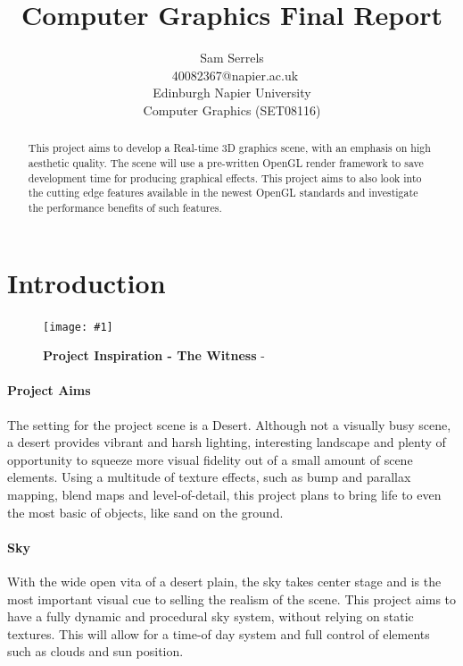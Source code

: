 \documentclass[conference]{acmsiggraph}
\title{Computer Graphics Final Report}
\author{Sam Serrels\\\ 40082367@napier.ac.uk \\
Edinburgh Napier University\\
Computer Graphics (SET08116)}
\newcommand{\figuremacroW}[4]{
	\begin{figure}[h] %
		\centering
		\texttt{[image: \#1]}
		\caption[#2]{\textbf{#2} - #3}
		\label{fig:#1}
	\end{figure}
}
\begin{document}

\maketitle

\begin{abstract}
This project aims to develop a Real-time 3D graphics scene, with an emphasis on high aesthetic quality. The scene will use a pre-written OpenGL render framework to save development time for producing graphical effects. This project aims to also look into the cutting edge features available in the newest OpenGL standards and investigate the performance benefits of such features.
\end{abstract}

\keywordlist

\section{Introduction}

\figuremacroW
{witness}
{Project Inspiration - The Witness}
{\protect\cite{Witness}}
{1.0}

\paragraph{Project Aims}
The setting for the project scene is a Desert. Although not a visually busy scene, a desert provides vibrant and harsh lighting, interesting landscape and plenty of opportunity to squeeze more visual fidelity out of a small amount of scene elements.
Using a multitude of texture effects, such as bump and parallax mapping, blend maps and level-of-detail, this project plans to bring life to even the most basic of objects, like sand on the ground.

\paragraph{Sky}
With the wide open vita of a desert plain, the sky takes center stage and is the most important visual cue to selling the realism of the scene. This project aims to have a fully dynamic and procedural sky system, without relying on static textures. This will allow for a time-of day system and full control of elements such as clouds and sun position.
\end{document}
